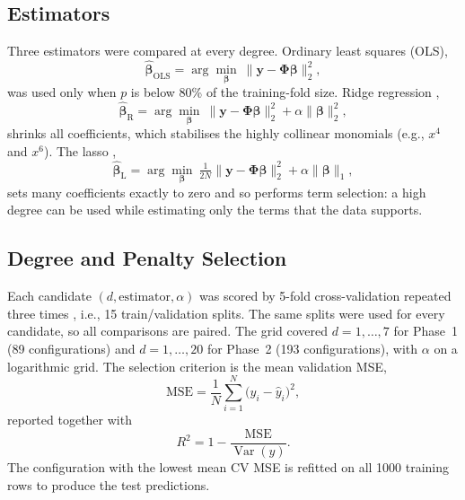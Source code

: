 \documentclass[conference]{IEEEtran}
\begin{document}
\subsection{Estimators}
Three estimators were compared at every degree. Ordinary least squares (OLS),
\begin{equation}
\hat{\boldsymbol\beta}_{\text{OLS}}=\arg\min_{\boldsymbol\beta}\ \lVert \mathbf{y}-\boldsymbol{\Phi}\boldsymbol\beta\rVert_2^2 ,
\end{equation}
was used only when $p$ is below 80\% of the training-fold size. Ridge regression \cite{hoerl1970},
\begin{equation}
\hat{\boldsymbol\beta}_{\text{R}}=\arg\min_{\boldsymbol\beta}\ \lVert \mathbf{y}-\boldsymbol{\Phi}\boldsymbol\beta\rVert_2^2+\alpha\lVert\boldsymbol\beta\rVert_2^2 ,
\end{equation}
shrinks all coefficients, which stabilises the highly collinear monomials (e.g., $x^4$ and $x^6$). The lasso \cite{tibshirani1996},
\begin{equation}
\hat{\boldsymbol\beta}_{\text{L}}=\arg\min_{\boldsymbol\beta}\ \tfrac{1}{2N}\lVert \mathbf{y}-\boldsymbol{\Phi}\boldsymbol\beta\rVert_2^2+\alpha\lVert\boldsymbol\beta\rVert_1 ,
\end{equation}
sets many coefficients exactly to zero and so performs term selection: a high degree can be used while estimating only the terms that the data supports.

\subsection{Degree and Penalty Selection}
Each candidate $(d,\text{estimator},\alpha)$ was scored by 5-fold cross-validation repeated three times \cite{kohavi1995}, i.e., 15 train/validation splits. The same splits were used for every candidate, so all comparisons are paired. The grid covered $d=1,\dots,7$ for Phase~1 (89 configurations) and $d=1,\dots,20$ for Phase~2 (193 configurations), with $\alpha$ on a logarithmic grid. The selection criterion is the mean validation MSE,
\begin{equation}
\text{MSE}=\frac{1}{N}\sum_{i=1}^{N}\bigl(y_i-\hat y_i\bigr)^2 ,
\end{equation}
reported together with
\begin{equation}
R^2 = 1-\frac{\text{MSE}}{\operatorname{Var}(y)} .
\end{equation}
The configuration with the lowest mean CV MSE is refitted on all 1000 training rows to produce the test predictions.
\end{document}
